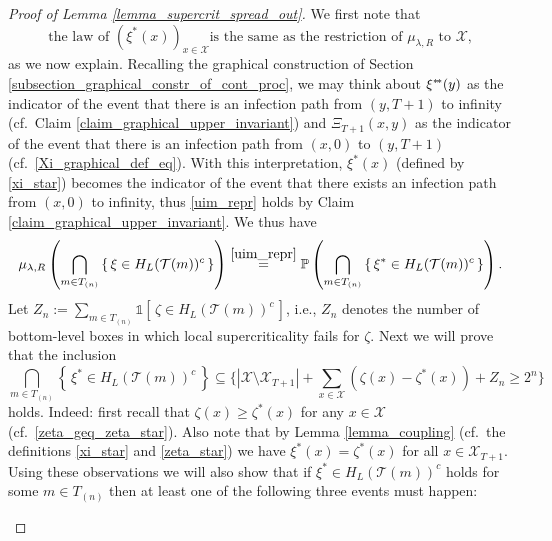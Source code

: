 \documentclass[a4paper,12pt]{article}
\newcommand{\sstar}{* \hspace{-.05cm} *}
\begin{document}
\begin{proof}[Proof of Lemma \ref{lemma_supercrit_spread_out}]
We first note that
\begin{equation}\label{uim_repr}
\text{the law of $\left(\xi^{*}(x)\right)_{x \in \mathcal{X} }$
 is the same as the restriction of $\mu_{\lambda,R}$ to $\mathcal{X}$,}
 \end{equation}
    as we now explain. Recalling the graphical construction of Section \ref{subsection_graphical_constr_of_cont_proc}, we may think about $\xi^{\sstar}(y)$ as the indicator
of the event that there is an infection path from $(y,T+1)$ to infinity (cf.\ Claim \ref{claim_graphical_upper_invariant}) and $\Xi_{T+1}(x,y)$ as the indicator
of the event that there is an infection path from $(x,0)$ to $(y,T+1)$ (cf.\ \eqref{Xi_graphical_def_eq}). With this interpretation,  $\xi^{*}(x)$ (defined by \eqref{xi_star}) becomes the indicator of the event that there exists an
infection path from $(x,0)$ to infinity, thus \eqref{uim_repr} holds by Claim \ref{claim_graphical_upper_invariant}. We thus have
\begin{equation}\label{xi_star_invariant}
\mu_{\lambda,R}\left( \bigcap_{m  \in T_{(n)}} \left\{ \, \xi \in H_L(\mathcal{T}(m))^c \,  \right\}    \right) \stackrel{ \eqref{uim_repr} }{=}
\mathbb{P}\left( \bigcap_{m  \in T_{(n)}} \left\{ \, \xi^* \in H_L( \mathcal{T}(m) )^c \,  \right\}    \right).
\end{equation}
Let  $Z_n:= \sum_{m \in T_{(n)} }  \mathds{1}\left[ \, \zeta \in H_L(\mathcal{T}(m))^c  \, \right]$, i.e., $Z_n$ denotes the number of bottom-level boxes in
which local supercriticality fails for $\zeta$.   Next we will prove that the inclusion
\begin{equation}\label{bad_inclusion_supercrit}
  \bigcap_{m  \in T_{(n)}} \left\{ \, \xi^* \in H_L( \mathcal{T}(m) )^c \,  \right\} \subseteq \{   |\mathcal{X} \setminus \mathcal{X}_{T+1}| +
  \sum_{x \in \mathcal{X} } \left( \zeta(x) - \zeta^{*}(x) \right) + Z_n \geq  2^n   \}
\end{equation}
holds.
Indeed: first recall that $\zeta(x) \geq \zeta^*(x)$ for any $x \in \mathcal{X}$ (cf.\ \eqref{zeta_geq_zeta_star}).
Also note that by Lemma \ref{lemma_coupling} (cf.\ the definitions \eqref{xi_star} and \eqref{zeta_star}) we have
$\xi^*(x)=\zeta^*(x)$ for all  $x \in \mathcal{X}_{T+1}$. Using these observations we will also show that
 if $ \xi^* \in H_L( \mathcal{T}(m) )^c $  holds for some $m \in  T_{(n)}$ then at least one of the following three events must happen:
\begin{enumerate}[(i)]

\end{enumerate}
\end{proof}
\end{document}
